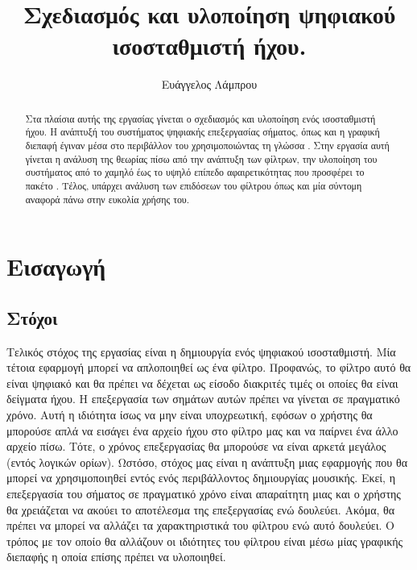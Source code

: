 \documentclass[12pt]{extarticle}
\begin{document}
\begin{titlepage}

\title{Σχεδιασμός και υλοποίηση ψηφιακού ισοσταθμιστή ήχου.}

\author{Ευάγγελος Λάμπρου}
\date{}

\maketitle


\begin{abstract}
    Στα πλαίσια αυτής της εργασίας γίνεται ο σχεδιασμός και υλοποίηση 
    ενός ισοσταθμιστή ήχου. 
    Η ανάπτυξή του συστήματος ψηφιακής επεξεργασίας σήματος, όπως 
    και η γραφική διεπαφή έγιναν μέσα στο περιβάλλον του 
     χρησιμοποιώντας τη γλώσσα . 
    Στην εργασία αυτή γίνεται η ανάλυση της θεωρίας πίσω από την ανάπτυξη των φίλτρων, 
    την υλοποίηση του συστήματος από το χαμηλό έως το υψηλό επίπεδο αφαιρετικότητας που 
    προσφέρει το πακέτο . 
    Τέλος, υπάρχει ανάλυση των επιδόσεων του φίλτρου όπως και μία σύντομη αναφορά πάνω 
    στην ευκολία χρήσης του.
\end{abstract}


\end{titlepage}

\linenumbers

\section{Εισαγωγή}

\subsection{Στόχοι} 
Τελικός στόχος της εργασίας είναι η δημιουργία ενός ψηφιακού ισοσταθμιστή. 
Μία τέτοια εφαρμογή μπορεί να απλοποιηθεί ως ένα φίλτρο. Προφανώς, 
το φίλτρο αυτό θα είναι ψηφιακό και θα πρέπει να δέχεται ως είσοδο διακριτές 
τιμές οι οποίες θα είναι δείγματα ήχου. 
Η επεξεργασία των σημάτων αυτών πρέπει να γίνεται σε πραγματικό χρόνο. 
Αυτή η ιδιότητα ίσως να μην είναι υποχρεωτική, εφόσων ο χρήστης 
θα μπορούσε απλά να εισάγει ένα αρχείο ήχου στο φίλτρο μας και να παίρνει ένα 
άλλο αρχείο πίσω. Τότε, ο χρόνος επεξεργασίας θα μπορούσε να είναι αρκετά 
μεγάλος (εντός λογικών ορίων). 
Ωστόσο, στόχος μας είναι η ανάπτυξη μιας εφαρμογής που θα μπορεί να χρησιμοποιηθεί 
εντός ενός περιβάλλοντος δημιουργίας μουσικής. Εκεί, η επεξεργασία του σήματος σε πραγματικό 
χρόνο είναι απαραίτητη μιας και ο χρήστης θα χρειάζεται να ακούει το αποτέλεσμα της επεξεργασίας 
ενώ δουλεύει. Ακόμα, θα πρέπει να μπορεί να αλλάζει τα χαρακτηριστικά του φίλτρου ενώ αυτό δουλεύει.
Ο τρόπος με τον οποίο θα αλλάζουν οι ιδιότητες του φίλτρου είναι μέσω μίας γραφικής διεπαφής η οποία 
επίσης πρέπει να υλοποιηθεί.
\end{document}
